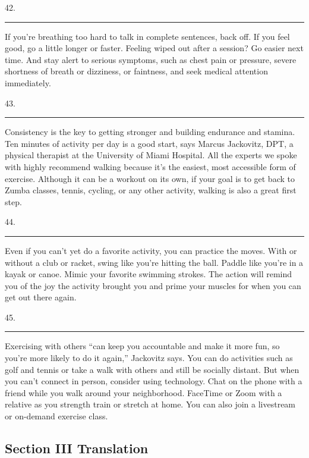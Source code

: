 \documentclass[UTF8,11pt]{ctexart}
\begin{document}
42. \par\noindent\rule{.95\linewidth}{.4pt}\par


If you’re breathing too hard to talk in complete sentences, back off. If you feel good, go a little longer or faster. Feeling wiped out after a session? Go easier next time. And stay alert to serious symptoms, such as chest pain or pressure, severe shortness of breath or dizziness, or faintness, and seek medical attention immediately.


43. \par\noindent\rule{.95\linewidth}{.4pt}\par


Consistency is the key to getting stronger and building endurance and stamina. Ten minutes of activity per day is a good start, says Marcus Jackovitz, DPT, a physical therapist at the University of Miami Hospital. All the experts we spoke with highly recommend walking because it’s the easiest, most accessible form of exercise. Although it can be a workout on its own, if your goal is to get back to Zumba classes, tennis, cycling, or any other activity, walking is also a great first step.


44. \par\noindent\rule{.95\linewidth}{.4pt}\par


Even if you can’t yet do a favorite activity, you can practice the moves. With or without a club or racket, swing like you’re hitting the ball. Paddle like you’re in a kayak or canoe. Mimic your favorite swimming strokes. The action will remind you of the joy the activity brought you and prime your muscles for when you can get out there again.


45. \par\noindent\rule{.95\linewidth}{.4pt}\par


Exercising with others “can keep you accountable and make it more fun, so you’re more likely to do it again,” Jackovitz says. You can do activities such as golf and tennis or take a walk with others and still be socially distant. But when you can’t connect in person, consider using technology. Chat on the phone with a friend while you walk around your neighborhood. FaceTime or Zoom with a relative as you strength train or stretch at home. You can also join a livestream or on-demand exercise class.


\subsection*{\textbf{Section III Translation}}
\end{document}
